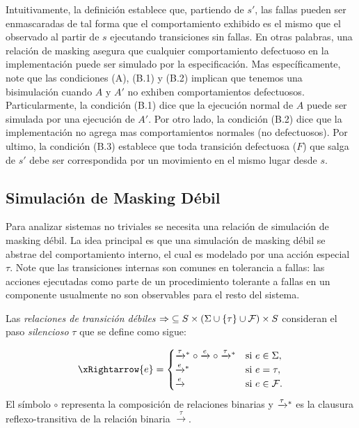  Intuitivamente, la definición establece que, partiendo de $s'$, las fallas pueden ser enmascaradas de tal forma que el comportamiento exhibido es el mismo que el observado al partir de $s$ ejecutando transiciones sin fallas. 
 En otras palabras, una relación de masking asegura que cualquier comportamiento defectuoso en la implementación puede ser simulado por la especificación. Mas específicamente, note que las condiciones (A), (B.1) y (B.2) implican que tenemos una bisimulación cuando $A$ y $A'$ no exhiben comportamientos defectuosos.
Particularmente, la condición (B.1) dice que la ejecución normal de $A$ puede ser simulada por una ejecución de $A'$. Por otro lado, la condición (B.2) dice que la implementación no agrega mas comportamientos normales (no defectuosos). Por ultimo, la condición (B.3) establece que toda transición defectuosa ($F$) que salga de $s'$ debe ser correspondida por un movimiento en el mismo lugar desde $s$.

\subsection{Simulación de Masking Débil}

Para analizar sistemas no triviales se necesita una relación de simulación de masking débil. La idea principal es que una simulación de masking débil se abstrae del comportamiento interno, el cual es modelado por una acción especial $\tau$. Note que las transiciones internas son comunes en tolerancia a fallas: las acciones ejecutadas como parte de un procedimiento tolerante a fallas en un componente usualmente no son observables para el resto del sistema.

Las \textit{relaciones de transición débiles} ${\Rightarrow} \subseteq S
\times (\Sigma \cup \{\tau\} \cup \mathcal{F}) \times S$ consideran el paso \emph{silencioso} $\tau$ que se define como sigue: 

\[
\xRightarrow{e} = 
       \begin{cases}
            \xrightarrowstar{\tau} \circ \xrightarrow{e} \circ \xrightarrowstar{\tau} & 
            \text{si } e \in \Sigma,  \\ 
            \xrightarrowstar{e} & \text{si } e = \tau,  \\
            \xrightarrow{e} & \text{si } e \in \Faults.\\
       \end{cases}
\]
%
El símbolo $\circ$ representa la composición de relaciones binarias y $\mathrel{{\xrightarrow[]{\tau}}{}^*}$ es la clausura reflexo-transitiva de la relación binaria $\xrightarrow{\tau}$. 

